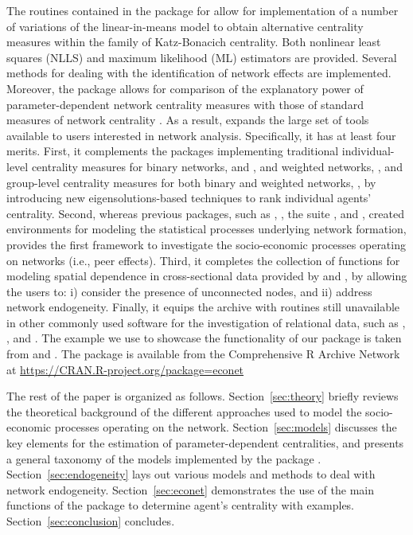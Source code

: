 \documentclass[nojss]{jss}
\begin{document}
The routines contained in the package  for  \citep{R} allow for implementation of a number of variations of the linear-in-means model to obtain alternative centrality measures within the family of Katz-Bonacich centrality. Both nonlinear least squares (NLLS) and maximum likelihood (ML) estimators are provided. Several methods for dealing with the identification of network effects are implemented. Moreover, the  package allows for comparison of the explanatory power of parameter-dependent network centrality measures with those of standard measures of network centrality \citep{Wasserman+Faust:1994}. As a result,  expands the large set of tools available to  users interested in network analysis. Specifically, it has at least four merits. First, it complements the  packages implementing traditional individual-level centrality measures for binary networks,  \citep{igraph} and  \citep{sna}, and weighted networks,  \citep{tnet}, and group-level centrality measures for both binary and weighted networks,  \citep{An+Liu:2016, keyplayer}, by introducing new eigensolutions-based techniques to rank individual agents' centrality. Second, whereas previous packages, such as  \citep{btergm},  \citep{hergm}, the  suite \citep{statnet}, and  \citep{xergm}, created environments for modeling the statistical processes underlying network formation,  provides the first framework to investigate the socio-economic processes operating on networks (i.e., peer effects). Third, it completes the collection of functions for modeling spatial dependence in cross-sectional data provided by  \citep{spdep} and  \citep{splm}, by allowing the users to: i) consider the presence of unconnected nodes, and ii) address network endogeneity. Finally, it equips the  archive with routines still unavailable in other commonly used software for the investigation of relational data, such as  \citep{MATLAB},  \citep{Batagelj:2003},  \citep{Python} and  \citep{Stata}. The example we use to showcase the functionality of our  package is taken from \cite{Battaglini+Patacchini:2018} and \cite{Battaglini+Sciabolazza+Patacchini:2020}. The  package  is available from the Comprehensive R Archive Network at \url{https://CRAN.R-project.org/package=econet} 

The rest of the paper is organized as follows. Section~\ref{sec:theory} briefly reviews the theoretical background of the different approaches used to model the socio-economic processes operating on the network. Section~\ref{sec:models} discusses the key elements for the estimation of parameter-dependent centralities, and presents a general taxonomy of the models implemented by the  package . Section~\ref{sec:endogeneity} lays out various models and methods to deal with network endogeneity. Section~\ref{sec:econet} demonstrates the use of the main functions of the package  to determine agent's centrality with examples. Section~\ref{sec:conclusion} concludes.
\end{document}
